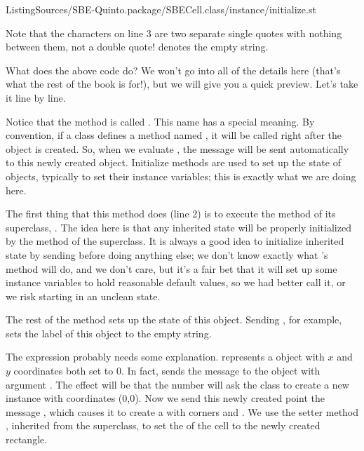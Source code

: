 \documentclass[a4paper,10pt,twoside]{book}
\begin{document}
%
{ListingSources/SBE-Quinto.package/SBECell.class/instance/initialize.st}	

\noindent
Note that the characters  on line 3 are two separate single quotes with nothing between them, not a double quote!   denotes the empty string.


What does the above code do?  We won't go into all of the details here (that's what the rest of the book is for!), but we will give you a quick preview.  Let's take it line by line.

Notice that the method is called .
This name has a special meaning.
By convention, if a class defines a method named , it will be called right after the object is created.
So, when we evaluate , the message  will be sent automatically to this newly created object.
Initialize methods are used to set up the state of objects, typically to set their instance variables; this is exactly what we are doing here.

The first thing that this method does (line 2) is to execute the  method of its superclass, .
The idea here is that any inherited state will be properly initialized by the  method of the superclass.
It is always a good idea to initialize inherited state by sending  before doing anything else; we don't know exactly what 's  method will do, and we don't care, but it's a fair bet that it will set up some instance variables to hold reasonable default values, so we had better call it, or we risk starting in an unclean state.

The rest of the method sets up the state of this object.
Sending , for example, sets the label of this object to the empty string.

The expression  probably needs some explanation. 
 represents a  object with $x$ and $y$ coordinates both set to 0.
In fact,  sends the message  to the  object  with argument .
The effect will be that the number  will ask the  class to create a new instance with coordinates (0,0).
Now we send this newly created point the message , which causes it to create a  with corners  and .
We use the setter method , inherited from the superclass, to set the  of the cell to the newly created rectangle.
\end{document}
